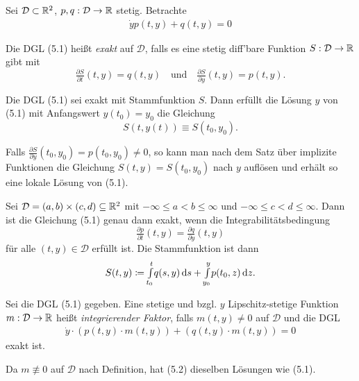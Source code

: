 \documentclass{cheat-sheet}
\newcommand{\D}{\mathcal{D}}
\begin{document}
\begin{prob}
  Sei $\D \subset \R^2$, $p, q : \D \to \R$ stetig. Betrachte
  \begin{align*}
    \dot{y} p(t, y) + q(t, y) = 0 \tag{5.1}
  \end{align*}
\end{prob}

\begin{defn}
  Die DGL (5.1) heißt \emph{exakt} auf $\D$, falls es eine stetig diff'bare Funktion $S : \D \to \R$ gibt mit
  \[
    \tfrac{\partial S}{\partial t}(t, y) = q(t, y)
    \quad \text{und} \quad
    \tfrac{\partial S}{\partial y}(t, y) = p(t, y).
  \]
\end{defn}

\begin{satz}
  Die DGL (5.1) sei exakt mit Stammfunktion $S$. Dann erfüllt die Lösung $y$ von (5.1) mit Anfangswert $y(t_0) = y_0$ die Gleichung
  \[ S(t, y(t)) \equiv S(t_0, y_0). \]
\end{satz}

\begin{bem}
  Falls $\tfrac{\partial S}{\partial y}(t_0, y_0) = p(t_0, y_0) \not= 0$, so kann man nach dem Satz über implizite Funktionen die Gleichung $S(t, y) = S(t_0, y_0)$ nach $y$ auflösen und erhält so eine lokale Lösung von (5.1).
\end{bem}



\begin{satz}
  Sei $\D = \ointerval{a}{b} \times \ointerval{c}{d} \subseteq \R^2$ mit $-\infty \leq a < b \leq \infty$ und $-\infty \leq c < d \leq \infty$. Dann ist die Gleichung (5.1) genau dann exakt, wenn die Integrabilitätsbedingung
  \[ \tfrac{\partial p}{\partial t}(t, y) = \tfrac{\partial q}{\partial y}(t, y) \]
  für alle $(t, y) \in \D$ erfüllt ist. Die Stammfunktion ist dann
  \[ S(t, y) \coloneqq {\textstyle \int\limits_{t_0}^{t}} q(s, y) \,\mathrm{d} s + {\textstyle \int\limits_{y_0}^{y}} p(t_0, z) \,\mathrm{d} z. \]
\end{satz}


\begin{defn}
  Sei die DGL (5.1) gegeben. Eine stetige und bzgl. $y$ Lipschitz-stetige Funktion $m : \D \to \R$ heißt \emph{integrierender Faktor}, falls $m(t, y) \not= 0$ auf $\D$ und die DGL
  \begin{align*}
    \dot{y} \cdot (p(t, y) \cdot m(t, y)) + (q(t, y) \cdot m(t, y)) = 0 \tag{5.2}
  \end{align*}
  exakt ist.
\end{defn}

\begin{bem}
  Da $m \not\equiv 0$ auf $\D$ nach Definition, hat (5.2) dieselben Lösungen wie (5.1).
\end{bem}

\end{document}
